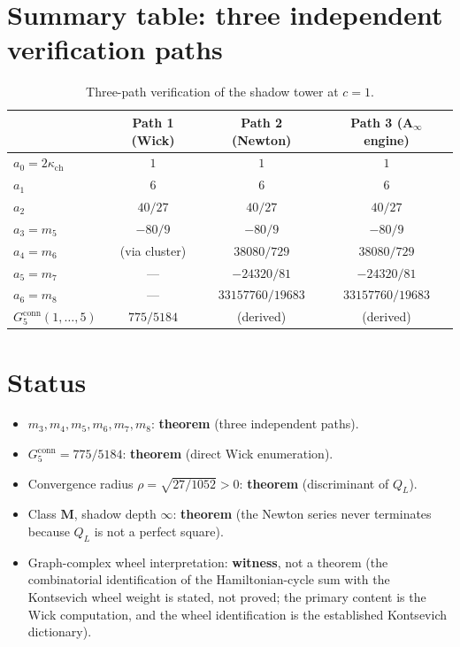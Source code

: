 \documentclass[11pt]{article}
\newcommand{\kch}{\kappa_{\mathrm{ch}}}
\newcommand{\conn}{\mathrm{conn}}
\begin{document}
\section{Summary table: three independent verification paths}

\begin{table}[h]\centering
\begin{tabular}{lccc}
\toprule
 & Path 1 (Wick) & Path 2 (Newton) & Path 3 (A$_\infty$ engine)\\
\midrule
$a_0=2\kch$  & $1$ & $1$ & $1$\\
$a_1$          & $6$ & $6$ & $6$\\
$a_2$          & $40/27$ & $40/27$ & $40/27$\\
$a_3=m_5$      & $-80/9$ & $-80/9$ & $-80/9$\\
$a_4=m_6$      & (via cluster) & $38080/729$ & $38080/729$\\
$a_5=m_7$      & --- & $-24320/81$ & $-24320/81$\\
$a_6=m_8$      & --- & $33157760/19683$ & $33157760/19683$\\
$G_5^\conn(1,\ldots,5)$ & $775/5184$ & (derived) & (derived)\\
\bottomrule
\end{tabular}
\caption{Three-path verification of the shadow tower at $c=1$.}
\end{table}

\section{Status}

\begin{itemize}
\item $m_3,m_4,m_5,m_6,m_7,m_8$: \textbf{theorem} (three independent paths).
\item $G_5^\conn=775/5184$: \textbf{theorem} (direct Wick enumeration).
\item Convergence radius $\rho=\sqrt{27/1052}>0$: \textbf{theorem}
(discriminant of $Q_L$).
\item Class $\mathbf{M}$, shadow depth $\infty$: \textbf{theorem} (the
Newton series never terminates because $Q_L$ is not a perfect square).
\item Graph-complex wheel interpretation: \textbf{witness}, not a theorem
(the combinatorial identification of the Hamiltonian-cycle sum with the
Kontsevich wheel weight is stated, not proved; the primary content is
the Wick computation, and the wheel identification is the established
Kontsevich dictionary).
\end{itemize}
\end{document}
